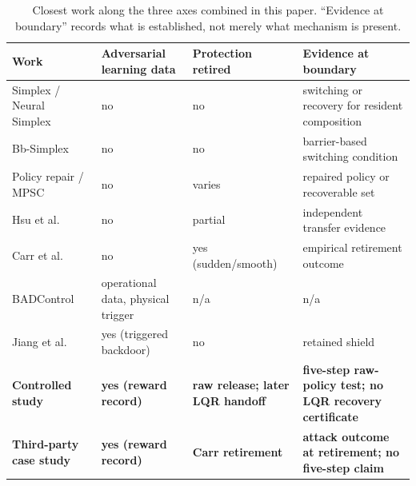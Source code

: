 \begin{table}[t]
\centering
\caption{Closest work along the three axes combined in this paper.  ``Evidence
at boundary'' records what is established, not merely what mechanism is
present.}
\label{tab:delta}
\footnotesize
\setlength{\tabcolsep}{4pt}
\begin{tabular}{@{}L{0.32\columnwidth}L{0.19\columnwidth}L{0.18\columnwidth}L{0.18\columnwidth}@{}}
\toprule
Work & Adversarial learning data & Protection retired & Evidence at boundary\\
\midrule
Simplex / Neural Simplex~\cite{seto_simplex_1998,phan_neural_simplex_2020} & no & no & switching or recovery for resident composition\\
Bb-Simplex~\cite{damare_bb_simplex_2025} & no & no & barrier-based switching condition\\
Policy repair / MPSC~\cite{zhou_runtime_policy_repair_2020,wabersich_linear_mpsc_2018} & no & varies & repaired policy or recoverable set\\
Hsu et al.~\cite{hsu_sim_lab_real_2023} & no & partial & independent transfer evidence\\
Carr et al.~\cite{carr_partial_shielding_2023} & no & yes (sudden/smooth) & empirical retirement outcome\\
BADControl~\cite{burbano_badcontrol_2026} & operational data, physical trigger & n/a & n/a\\
Jiang et al.~\cite{jiang_backdoor_safe_rl_cps_2024} & yes (triggered backdoor) & no & retained shield\\
\textbf{Controlled study} & \textbf{yes (reward record)} & \textbf{raw release; later LQR handoff} & \textbf{five-step raw-policy test; no LQR recovery certificate}\\
\textbf{Third-party case study} & \textbf{yes (reward record)} & \textbf{Carr retirement} & \textbf{attack outcome at retirement; no five-step claim}\\
\bottomrule
\end{tabular}
\end{table}


